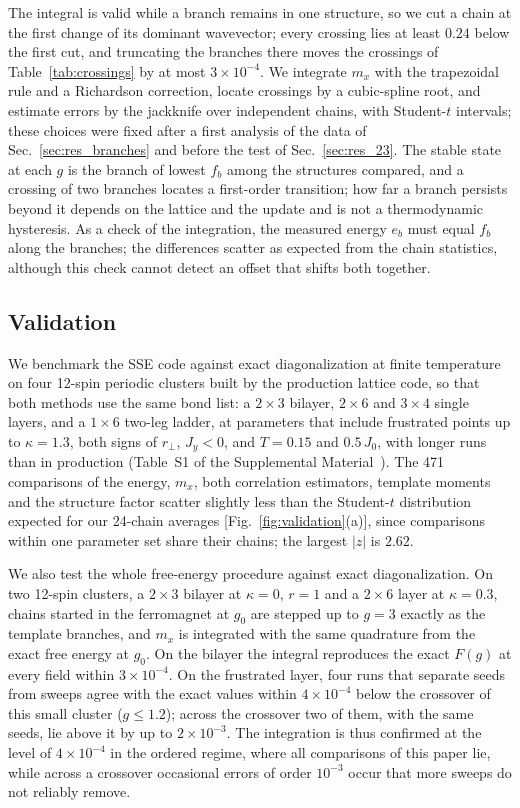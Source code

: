 \documentclass[
 aps,prb,
 twocolumn,
 superscriptaddress,
 longbibliography,
 nofootinbib,
 floatfix
]{revtex4-2}
\newcommand{\rp}{r_\perp}
\begin{document}
The integral is valid while a branch remains in one structure, so we cut a chain at the first change of its dominant
wavevector; every crossing lies at least $0.24$ below the first cut, and truncating the branches there moves the
crossings of Table~\ref{tab:crossings} by at most $3\times10^{-4}$. We integrate $m_x$ with the trapezoidal rule and a Richardson correction, locate crossings by a
cubic-spline root, and estimate errors by the jackknife over independent chains, with Student-$t$ intervals; these choices were fixed after a first
analysis of the data of Sec.~\ref{sec:res_branches} and before the test of Sec.~\ref{sec:res_23}. The stable state at each $g$ is the branch of
lowest $f_b$ among the structures compared, and a crossing of two branches locates a first-order transition; how far a branch persists beyond it depends on the lattice and the update and
is not a thermodynamic hysteresis. As a check of the integration, the measured energy $e_b$ must equal $f_b$ along the
branches; the differences scatter as expected from the chain statistics, although this check cannot detect an offset
that shifts both together.

\subsection{Validation}
\label{sec:validation}

We benchmark the SSE code against exact diagonalization at finite temperature on four 12-spin
periodic clusters built by the production lattice code, so that both methods use the same bond list: a $2\times3$
bilayer, $2\times6$ and $3\times4$ single layers, and a $1\times6$ two-leg ladder, at parameters that include frustrated
points up to $\kappa=1.3$, both signs of $\rp$, $J_y<0$, and $T=0.15$ and $0.5\,J_0$, with longer runs
than in production (Table~S1 of the Supplemental Material~\cite{supp}). The 471
comparisons of the energy, $m_x$, both correlation estimators, template moments and the structure factor scatter
slightly less than the Student-$t$ distribution expected for our 24-chain averages [Fig.~\ref{fig:validation}(a)],
since comparisons within one parameter set share their chains; the largest $|z|$ is $2.62$.

We also test the whole free-energy procedure against exact diagonalization. On two 12-spin clusters, a $2\times3$
bilayer at $\kappa=0$, $r=1$ and a $2\times6$ layer at $\kappa=0.3$, chains started in the ferromagnet at $g_0$
are stepped up to $g=3$ exactly as the template branches, and $m_x$ is integrated with the same quadrature from
the exact free energy at $g_0$. On the bilayer the integral reproduces the exact $F(g)$ at every field within
$3\times10^{-4}$. On the frustrated layer, four runs that separate seeds from sweeps agree with the exact values within
$4\times10^{-4}$ below the crossover of this small cluster ($g\le1.2$); across the crossover two of them, with the same
seeds, lie above it by up to $2\times10^{-3}$. The integration is thus confirmed at the level of $4\times10^{-4}$ in the
ordered regime, where all comparisons of this paper lie, while across a crossover occasional errors of order $10^{-3}$
occur that more sweeps do not reliably remove.
\end{document}
